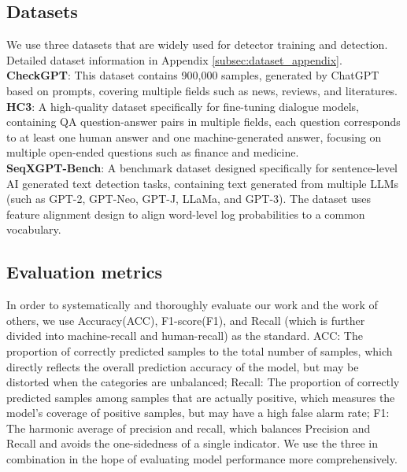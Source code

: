 \documentclass[11pt]{article}
\newcommand{\greenCitep}[1]{\textcolor{darkgreen}{\citep{#1}}}
\begin{document}
	\subsection{Datasets}
	\label{sec:dataset}
	We use three datasets that are widely used for detector training and detection. Detailed dataset information in Appendix \ref{subsec:dataset_appendix}. \\
	\textbf{CheckGPT}\greenCitep{liu2024checkgpt}: This dataset contains 900,000 samples, generated by ChatGPT based on prompts, covering multiple fields such as news, reviews, and literatures.\\
	\textbf{HC3}\greenCitep{guo2023simpleai}: A high-quality dataset specifically for fine-tuning dialogue models, containing QA question-answer pairs in multiple fields, each question corresponds to at least one human answer and one machine-generated answer, focusing on multiple open-ended questions such as finance and medicine.\\
	\textbf{SeqXGPT-Bench}\greenCitep{wang2023seqxgpt}: A benchmark dataset designed specifically for sentence-level AI generated text detection tasks, containing text generated from multiple LLMs (such as GPT-2, GPT-Neo, GPT-J, LLaMa, and GPT-3). The dataset uses feature alignment design to align word-level log probabilities to a common vocabulary.

	\subsection{Evaluation metrics}
	\label{sec:metrics}
	In order to systematically and thoroughly evaluate our work and the work of others, we use Accuracy(ACC), F1-score(F1), and Recall (which is further divided into machine-recall and human-recall) as the standard. ACC: The proportion of correctly predicted samples to the total number of samples, which directly reflects the overall prediction accuracy of the model, but may be distorted when the categories are unbalanced; Recall: The proportion of correctly predicted samples among samples that are actually positive, which measures the model's coverage of positive samples, but may have a high false alarm rate; F1: The harmonic average of precision and recall, which balances Precision and Recall and avoids the one-sidedness of a single indicator. We use the three in combination in the hope of evaluating model performance more comprehensively.
	
\end{document}

